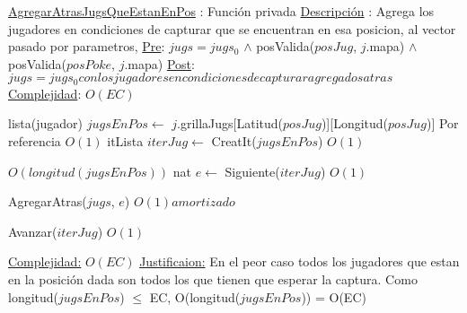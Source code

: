 \begin{Algoritmos}
\begin{algorithm}[H]
\begin{algorithmic}[1]
\Statex \underline{AgregarAtrasJugsQueEstanEnPos} : Funci\'on privada 
\Statex \underline{Descripci\'on} : Agrega los jugadores en condiciones de capturar que se encuentran en esa posicion, al vector pasado por parametros,   
\Statex \underline{Pre}: $jugs = jugs_0$ $\land$  posValida($posJug$, $j$.mapa) $\land$ posValida($posPoke$, $j$.mapa)
\Statex \underline{Post}: $jugs = jugs_0 con los jugadores en condiciones de capturar agregados atras$
\Statex \underline{Complejidad}: $O(EC)$ 

\State lista(jugador) $jugsEnPos \gets$ $j$.grillaJugs[Latitud($posJug$)][Longitud($posJug$)] \Comment Por referencia $O(1)$
\State itLista $iterJug \gets$ CreatIt($jugsEnPos$) \Comment $O(1)$

 \Comment $O(longitud(jugsEnPos))$
    \State nat $e \gets$ Siguiente($iterJug$) \Comment $O(1)$

        \State AgregarAtras($jugs$, $e$) \Comment $O(1) amortizado$
    \EndIf 

    \State Avanzar($iterJug$) \Comment $O(1)$


\EndWhile

\medskip
\Statex \underline{Complejidad:} $O(EC)$
\Statex \underline{Justificaion:} En el peor caso todos los jugadores que estan en la posici\'on dada son todos los que tienen que esperar la captura. Como longitud($jugsEnPos$) $\leq$ EC, O(longitud($jugsEnPos$)) = O(EC)

\end{algorithmic}
\end{algorithm}  
  



\end{Algoritmos}